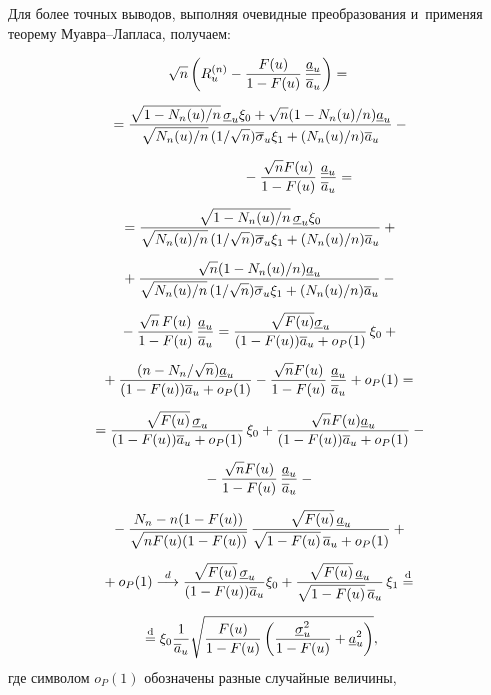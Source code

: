 \begin{multicols}{2}
Для более точных выводов, выполняя очевидные преобразования и~применяя 
теорему Муав\-ра--Лап\-ла\-са, получаем:

\noindent
\begin{multline*}
\sqrt{n}\left(R_u^{(n)}-\displaystyle\frac{\displaystyle F(u)\mathstrut}{\displaystyle 1-F(u)\mathstrut}\,
\displaystyle\frac{\displaystyle \underline{a}_u\mathstrut}{\displaystyle \overline{a}_u\mathstrut} \right)={}\\[6pt]
{}=
\displaystyle\frac{\displaystyle \sqrt{1-{N_n(u)}/{n}}\,\underline{\sigma}_u
\xi_0+\sqrt{n}(1-{N_n(u)}/{n})\underline{a}_u\mathstrut}{\displaystyle \sqrt{{N_n(u)}/{n}}\,({1}/{\sqrt{n}}) 
\overline{\sigma}_u \xi_1+({N_n(u)}/{n})\overline{a}_u\mathstrut}
-{}
\end{multline*}

\noindent
\begin{multline*}
\hspace*{20mm}{}-\fr{\sqrt{n}F(u)}{1-F(u)}\,\fr{\underline{a}_u}{\overline{a}_u}={}
\\[6pt]
{}=\fr{\sqrt{1-{N_n(u)}/{n}}\,\underline{\sigma}_u \xi_0}
{\sqrt{{N_n(u)}/{n}}\,({1}/{\sqrt{n}})\overline{\sigma}_u
\xi_1+({N_n(u)}/{n}) \overline{a}_u}
+{}\\[6pt]
{}+\fr{\sqrt{n}(1-{N_n(u)}/{n})\underline{a}_u}
{\sqrt{{N_n(u)}/{n}}\,({1}/{\sqrt{n}})\overline{\sigma}_u
\xi_1+({N_n(u)}/{n})\overline{a}_u}
-{}\\[6pt]
{}-\fr{\sqrt{n}\,F(u)}{1-F(u)}\,\fr{\underline{a}_u}{\overline{a}_u}=
\fr{\sqrt{F(u)}\underline{\sigma}_u}
{(1-F(u))\overline{a}_u+o_P(1)}\,\xi_0+{}\\[6pt]
{}+
\fr{({n-N_n}/{\sqrt{n}})\underline{a}_u}
{(1-F(u))\overline{a}_u+o_P(1)}
-\fr{\sqrt{n}F(u)}{1-F(u)}\,
\fr{\underline{a}_u}{\overline{a}_u}+o_P(1)={}
\\[6pt]
{}=\fr{\sqrt{F(u)}\,\underline{\sigma}_u}{(1-F(u))\overline{a}_u+o_P(1)}\,
\xi_0+\fr{\sqrt{n}F(u)\underline{a}_u}
{(1-F(u))\overline{a}_u+o_P(1)}
-{}\\[6pt]
{}-\fr{\sqrt{n}F(u)}{1-F(u)}\,\fr{\underline{a}_u}{\overline{a}_u}-{}
\\[6pt]
{}-\fr{N_n-n(1-F(u))}{\sqrt{nF(u)(1-F(u))}}\,
\fr{\sqrt{F(u)}\,\underline{a}_u}
{\sqrt{1-F(u)}\,\overline{a}_u+o_P(1)}+{}\\[6pt]
{}+o_P(1)\tod
\fr{\sqrt{F(u)}\,\underline{\sigma}_u}{(1-F(u))\overline{a}_u} \xi_0+
\fr{\sqrt{F(u)}\,\underline{a}_u}
{\sqrt{1-F(u)}\,\overline{a}_u}\,\xi_1\eqd{}\\[6pt]
{}\eqd
\xi_0 \fr{1}{\overline{a}_u}\sqrt{\fr{F(u)}{1-F(u)}
\left(\fr{\underline{\sigma}^2_u}{1-F(u)}+
\underline{a}^2_u\right)},
\end{multline*}
где символом $o_P(1)$ обозначены разные случайные величины, 

\end{multicols}
